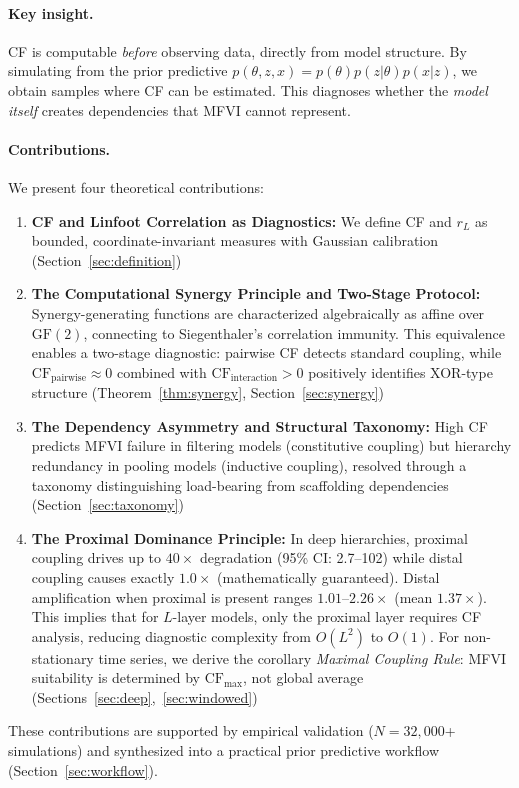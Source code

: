 \documentclass[10pt]{article} %
\theoremstyle{plain}
\theoremstyle{definition}
\newcommand{\CF}{\mathrm{CF}}
\begin{document}
\paragraph{Key insight.} CF is computable \emph{before} observing data, directly from model structure. By simulating from the prior predictive $p(\theta, z, x) = p(\theta)p(z|\theta)p(x|z)$, we obtain samples where CF can be estimated. This diagnoses whether the \emph{model itself} creates dependencies that MFVI cannot represent.

\paragraph{Contributions.} We present four theoretical contributions:
\begin{enumerate}
    \item \textbf{CF and Linfoot Correlation as Diagnostics:} We define CF and $r_L$ as bounded, coordinate-invariant measures with Gaussian calibration (Section~\ref{sec:definition})
    \item \textbf{The Computational Synergy Principle and Two-Stage Protocol:} Synergy-generating functions are characterized algebraically as affine over $\text{GF}(2)$, connecting to Siegenthaler's correlation immunity. This equivalence enables a two-stage diagnostic: pairwise CF detects standard coupling, while $\CF_{\text{pairwise}} \approx 0$ combined with $\CF_{\text{interaction}} > 0$ positively identifies XOR-type structure (Theorem~\ref{thm:synergy}, Section~\ref{sec:synergy})
    \item \textbf{The Dependency Asymmetry and Structural Taxonomy:} High CF predicts MFVI failure in filtering models (constitutive coupling) but hierarchy redundancy in pooling models (inductive coupling), resolved through a taxonomy distinguishing load-bearing from scaffolding dependencies (Section~\ref{sec:taxonomy})
    \item \textbf{The Proximal Dominance Principle:} In deep hierarchies, proximal coupling drives up to $40\times$ degradation (95\% CI: 2.7--102) while distal coupling causes exactly $1.0\times$ (mathematically guaranteed). Distal amplification when proximal is present ranges $1.01$--$2.26\times$ (mean $1.37\times$). This implies that for $L$-layer models, only the proximal layer requires CF analysis, reducing diagnostic complexity from $O(L^2)$ to $O(1)$. For non-stationary time series, we derive the corollary \emph{Maximal Coupling Rule}: MFVI suitability is determined by $\text{CF}_{\max}$, not global average (Sections~\ref{sec:deep},~\ref{sec:windowed})
\end{enumerate}
These contributions are supported by empirical validation ($N = 32{,}000$+ simulations) and synthesized into a practical prior predictive workflow (Section~\ref{sec:workflow}).
\end{document}
